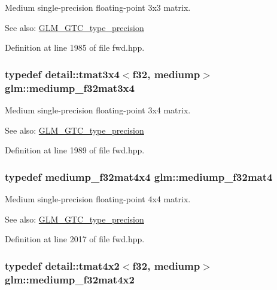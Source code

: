 Medium single-precision floating-point 3x3 matrix. \begin{Desc}
\item[See also:]\hyperlink{group__gtc__type__precision}{GLM\_\-GTC\_\-type\_\-precision} \end{Desc}


Definition at line 1985 of file fwd.hpp.\hypertarget{group__gtc__type__precision_g7ad59b967576d930f4c8aa7b8c48e1af}{
\subsubsection[mediump\_\-f32mat3x4]{\setlength{\rightskip}{0pt plus 5cm}typedef detail::tmat3x4$<$f32, mediump$>$ {\bf glm::mediump\_\-f32mat3x4}}}
\label{group__gtc__type__precision_g7ad59b967576d930f4c8aa7b8c48e1af}


Medium single-precision floating-point 3x4 matrix. \begin{Desc}
\item[See also:]\hyperlink{group__gtc__type__precision}{GLM\_\-GTC\_\-type\_\-precision} \end{Desc}


Definition at line 1989 of file fwd.hpp.\hypertarget{group__gtc__type__precision_g56bd98ec31b6abc0315d688d4ecd94a0}{
\subsubsection[mediump\_\-f32mat4]{\setlength{\rightskip}{0pt plus 5cm}typedef mediump\_\-f32mat4x4 {\bf glm::mediump\_\-f32mat4}}}
\label{group__gtc__type__precision_g56bd98ec31b6abc0315d688d4ecd94a0}


Medium single-precision floating-point 4x4 matrix. \begin{Desc}
\item[See also:]\hyperlink{group__gtc__type__precision}{GLM\_\-GTC\_\-type\_\-precision} \end{Desc}


Definition at line 2017 of file fwd.hpp.\hypertarget{group__gtc__type__precision_g3400d5463f0a58cf3959406aa2b69f72}{
\subsubsection[mediump\_\-f32mat4x2]{\setlength{\rightskip}{0pt plus 5cm}typedef detail::tmat4x2$<$f32, mediump$>$ {\bf glm::mediump\_\-f32mat4x2}}}
\label{group__gtc__type__precision_g3400d5463f0a58cf3959406aa2b69f72}


